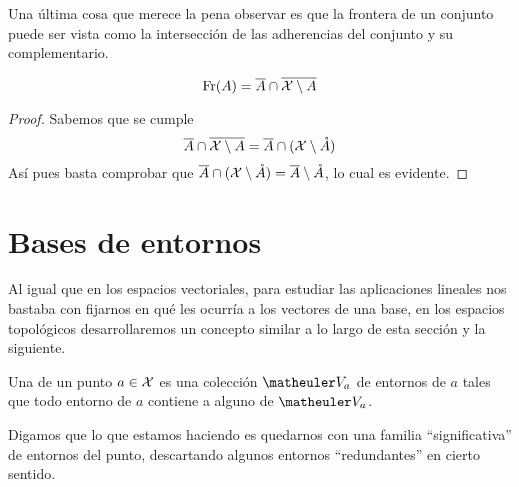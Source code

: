 Una última cosa que merece la pena observar es que la frontera de un conjunto puede ser vista como la intersección de las adherencias del conjunto y su complementario.
\begin{lem}
	\begin{equation*}
		\operatorname{\mathrm{Fr}}(A)=\overline{A}\cap\overline{\mathcal{X} \setminus A}
	\end{equation*}
\end{lem}
\begin{proof}
	Sabemos que se cumple
	\begin{equation*}
		\overline{A}\cap\overline{\mathcal{X} \setminus A}=\overline{A}\cap(\mathcal{X} \setminus \mathring{A})
	\end{equation*}
	Así pues basta comprobar que $\overline{A}\cap(\mathcal{X} \setminus \mathring{A})=\overline{A}\setminus \mathring{A}$, lo cual es evidente.
\end{proof}

\section{Bases de entornos}
Al igual que en los espacios vectoriales, para estudiar las aplicaciones lineales nos bastaba con fijarnos en qué les ocurría a los vectores de una base, en los espacios topológicos desarrollaremos un concepto similar a lo largo de esta sección y la siguiente.
\begin{defi}
	\label{etop_bases_entornos}
	Una  de un punto $a\in\mathcal{X}$ es una colección $\Va{a}$ de entornos de $a$ tales que todo entorno de $a$ contiene a alguno de $\Va{a}$.
\end{defi}

Digamos que lo que estamos haciendo es quedarnos con una familia ``significativa'' de entornos del punto, descartando algunos entornos ``redundantes'' en cierto sentido.

